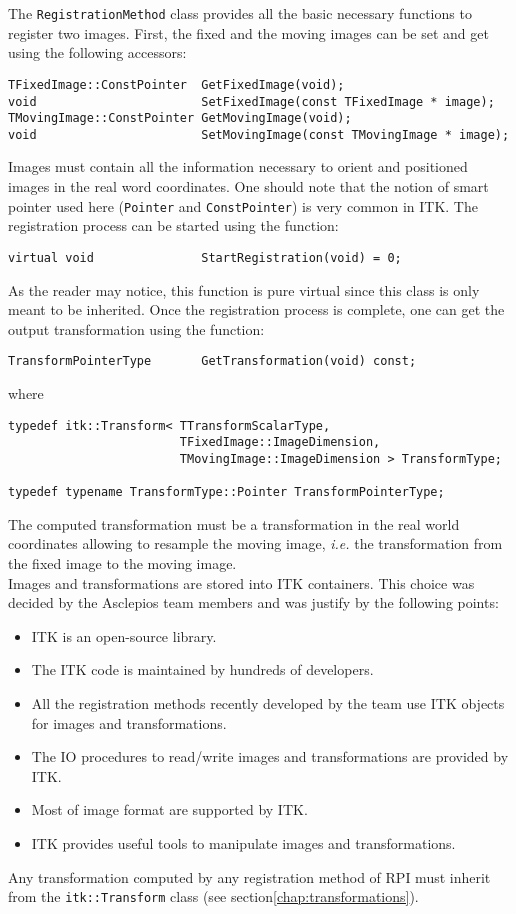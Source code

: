 The \texttt{RegistrationMethod} class provides all the basic necessary functions to register two images. First, the fixed and the moving images can be set and get using the following accessors:
%
\begin{lstlisting}
TFixedImage::ConstPointer  GetFixedImage(void);
void                       SetFixedImage(const TFixedImage * image);
TMovingImage::ConstPointer GetMovingImage(void);
void                       SetMovingImage(const TMovingImage * image);
\end{lstlisting}
%
Images must contain all the information necessary to orient and positioned images in the real word coordinates. One should note that the notion of smart pointer used here (\texttt{Pointer} and \texttt{ConstPointer}) is very common in ITK. The registration process can be started using the function:
%
\begin{lstlisting}
virtual void               StartRegistration(void) = 0;
\end{lstlisting}
%
As the reader may notice, this function is pure virtual since this class is only meant to be inherited. Once the registration process is complete, one can get the output transformation using the function:
%
\begin{lstlisting}
TransformPointerType       GetTransformation(void) const;
\end{lstlisting}
%
where
%
\begin{lstlisting}
typedef itk::Transform< TTransformScalarType,
                        TFixedImage::ImageDimension,
                        TMovingImage::ImageDimension > TransformType;
                        
typedef typename TransformType::Pointer TransformPointerType;
\end{lstlisting}
%
The computed transformation must be a transformation in the real world coordinates allowing to resample the moving image, \textit{i.e.} the transformation from the fixed image to the moving image.
\\
Images and transformations are stored into ITK containers. This choice was decided by the Asclepios team members and was justify by the following points:
%
\begin{itemize}
    \item ITK is an open-source library.
    \item The ITK code is maintained by hundreds of developers.
    \item All the registration methods recently developed by the team use ITK objects for images and transformations.
    \item The IO procedures to read/write images and transformations are provided by ITK.
    \item Most of image format are supported by ITK.
    \item ITK provides useful tools to manipulate images and transformations.
\end{itemize}
%
Any transformation computed by any registration method of RPI must inherit from the \texttt{itk::Transform} class (see section\ref{chap:transformations}).
\\

